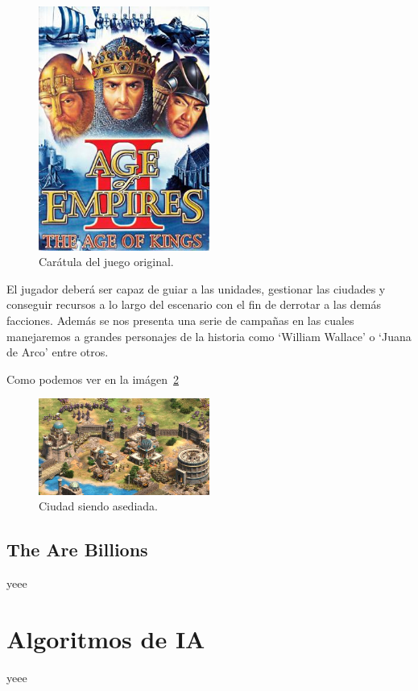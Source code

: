 \begin{figure}[ht]
\centering
\includegraphics[width=0.5\textwidth]{imagenes/aoe_1.png}
\caption{Carátula del juego original.}
\label{img:aoe_1}
\end{figure}

El jugador deberá ser capaz de guiar a las unidades, gestionar las ciudades y conseguir
recursos a lo largo del escenario con el fin de derrotar a las demás facciones. Además se
nos presenta una serie de campañas en las cuales manejaremos a grandes personajes de la
historia como `William Wallace' o `Juana de Arco' entre otros.

Como podemos ver en la imágen~\ref{img:aoe_2}

\begin{figure}[ht]
\centering
\includegraphics[width=0.5\textwidth]{imagenes/aoe_2.png}
\caption{Ciudad siendo asediada.}
\label{img:aoe_2}
\end{figure}

\subsection{The Are Billions}
yeee

\section{Algoritmos de IA}
yeee

